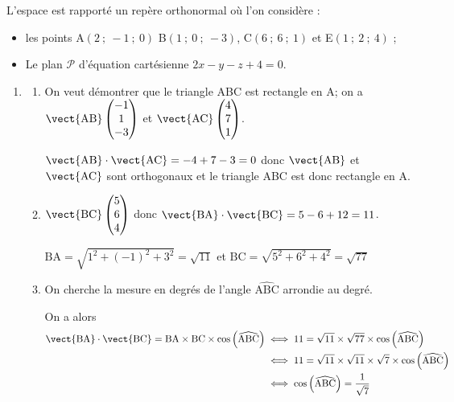\medskip

L'espace est rapporté un repère orthonormal où l'on considère :

\setlength\parindent{1cm}
\begin{itemize}
\item[$\bullet~~$]les points A$(2~;~-1~;~0)$ B$(1~;~0~;~- 3)$, C$(6~;~6~;~1)$  et E$(1~;~2~;~4)$ ;
\item[$\bullet~~$]Le plan $\mathcal{P}$ d'équation cartésienne $2x - y - z + 4 = 0$.
\end{itemize}
\setlength\parindent{0cm}

\medskip

\begin{enumerate}
\item
	\begin{enumerate}
		\item On veut démontrer que le triangle ABC est rectangle en A; on a 
$\vect{\text{AB}}\begin{pmatrix}-1\\1\\-3 \end{pmatrix}$ et $\vect{\text{AC}}\begin{pmatrix}4\\7\\1 \end{pmatrix}$.
		
$\vect{\text{AB}} \cdot \vect{\text{AC}}=-4 +7-3=0$ donc   $\vect{\text{AB}}$ et $\vect{\text{AC}}$ sont orthogonaux et le triangle ABC est donc rectangle en A.

		\item $\vect{\text{BC}}\begin{pmatrix}5\\6\\4 \end{pmatrix}$
donc $\vect{\text{BA}} \cdot \vect{\text{BC}}=5-6+12=11$.

$\text{BA}= \sqrt{1^2+(-1)^2+3^2}=\sqrt{11}$ et $\text{BC}=\sqrt{5^2+6^2+4^2} =\sqrt{77}$

		\item On cherche la mesure en degrés de l'angle $\widehat{\text{ABC}}$ arrondie au degré.

On a alors
\begin{align*}
\vect{\text{BA}} \cdot \vect{\text{BC}}= \text{BA}\times\text{BC}\times \cos\left(\widehat{\text{ABC}}\right)&\iff 11=\sqrt{11}\times \sqrt{77} \times \cos\left(\widehat{\text{ABC}}\right)\\
&\iff 11=\sqrt{11}\times \sqrt{11}\times \sqrt{7}\times \cos\left(\widehat{\text{ABC}}\right) \\
&\iff \cos\left(\widehat{\text{ABC}}\right) = \dfrac{1}{\sqrt{7}}
\end{align*}


\end{enumerate}
\end{enumerate}
